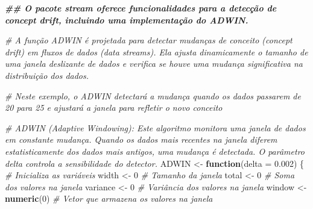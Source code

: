 \documentclass[
]{article}
\newenvironment{Shaded}{\begin{snugshade}}{\end{snugshade}}
\newcommand{\AttributeTok}[1]{\textcolor[rgb]{0.13,0.29,0.53}{#1}}
\newcommand{\CommentTok}[1]{\textcolor[rgb]{0.56,0.35,0.01}{\textit{#1}}}
\newcommand{\ControlFlowTok}[1]{\textcolor[rgb]{0.13,0.29,0.53}{\textbf{#1}}}
\newcommand{\DecValTok}[1]{\textcolor[rgb]{0.00,0.00,0.81}{#1}}
\newcommand{\DocumentationTok}[1]{\textcolor[rgb]{0.56,0.35,0.01}{\textbf{\textit{#1}}}}
\newcommand{\FloatTok}[1]{\textcolor[rgb]{0.00,0.00,0.81}{#1}}
\newcommand{\FunctionTok}[1]{\textcolor[rgb]{0.13,0.29,0.53}{\textbf{#1}}}
\newcommand{\NormalTok}[1]{#1}
\newcommand{\OtherTok}[1]{\textcolor[rgb]{0.56,0.35,0.01}{#1}}
\begin{document}
\begin{Shaded}
\begin{Highlighting}[]
\DocumentationTok{\#\# O pacote stream oferece funcionalidades para a detecção de concept drift, incluindo uma implementação do ADWIN.}

\CommentTok{\# A função ADWIN é projetada para detectar mudanças de conceito (concept drift) em fluxos de dados (data streams). Ela ajusta dinamicamente o tamanho de uma janela deslizante de dados e verifica se houve uma mudança significativa na distribuição dos dados.}

\CommentTok{\# Neste exemplo, o ADWIN detectará a mudança quando os dados passarem de 20 para 25 e ajustará a janela para refletir o novo conceito}

\CommentTok{\# ADWIN (Adaptive Windowing): Este algoritmo monitora uma janela de dados em constante mudança. Quando os dados mais recentes na janela diferem estatisticamente dos dados mais antigos, uma mudança é detectada. O parâmetro delta controla a sensibilidade do detector.}
\NormalTok{ADWIN }\OtherTok{\textless{}{-}} \ControlFlowTok{function}\NormalTok{(}\AttributeTok{delta =} \FloatTok{0.002}\NormalTok{) \{}
  \CommentTok{\# Inicializa as variáveis}
\NormalTok{  width }\OtherTok{\textless{}{-}} \DecValTok{0} \CommentTok{\# Tamanho da janela}
\NormalTok{  total }\OtherTok{\textless{}{-}} \DecValTok{0} \CommentTok{\# Soma dos valores na janela}
\NormalTok{  variance }\OtherTok{\textless{}{-}} \DecValTok{0} \CommentTok{\# Variância dos valores na janela}
\NormalTok{  window }\OtherTok{\textless{}{-}} \FunctionTok{numeric}\NormalTok{(}\DecValTok{0}\NormalTok{) }\CommentTok{\# Vetor que armazena os valores na janela}
  

\end{Highlighting}
\end{Shaded}
\end{document}
